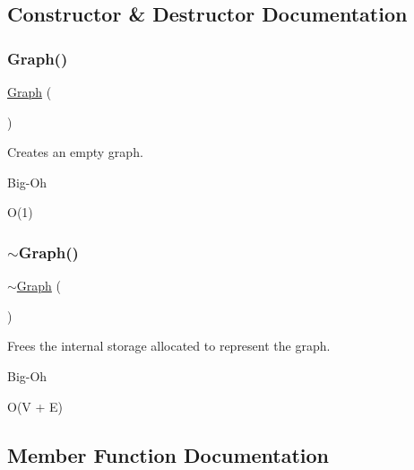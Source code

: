 \subsection{Constructor \& Destructor Documentation}
\mbox{\label{classGraph_afc5ef9d72cc2c509814200791eaef62c}} 
\subsubsection{\texorpdfstring{Graph()}{Graph()}}
{\footnotesize\ttfamily \mbox{\hyperlink{classGraph}{Graph}} (\begin{DoxyParamCaption}{ }\end{DoxyParamCaption})}



Creates an empty graph. 

\begin{DoxyRefDesc}{Big-\/\+Oh}
\item[\mbox{\hyperlink{BigOh__BigOh000040}{Big-\/\+Oh}}]O(1) \end{DoxyRefDesc}
\mbox{\label{classGraph_af5a604e5e9e4d68dbc10b312e59f678f}} 
\subsubsection{\texorpdfstring{$\sim$\+Graph()}{~Graph()}}
{\footnotesize\ttfamily $\sim$\mbox{\hyperlink{classGraph}{Graph}} (\begin{DoxyParamCaption}{ }\end{DoxyParamCaption})\hspace{0.3cm}{\ttfamily [virtual]}}



Frees the internal storage allocated to represent the graph. 

\begin{DoxyRefDesc}{Big-\/\+Oh}
\item[\mbox{\hyperlink{BigOh__BigOh000041}{Big-\/\+Oh}}]O(V + E) \end{DoxyRefDesc}


\subsection{Member Function Documentation}
\mbox{\label{classGraph_aad2e9fedd7110ae2fb6873c5e2d29941}} 
